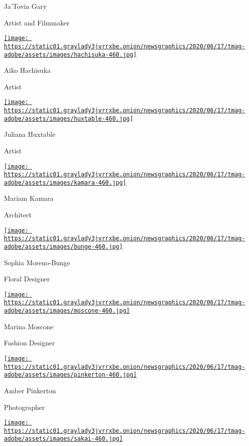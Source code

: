 Ja'Tovia Gary

Artist and Filmmaker

\href{https://www.nytimes3xbfgragh.onion/2020/08/10/t-magazine/aiko-hachisuka-art-sculpture.html}{\texttt{[image: https://static01.graylady3jvrrxbe.onion/newsgraphics/2020/06/17/tmag-adobe/assets/images/hachisuka-460.jpg]}}

Aiko Hachisuka

Artist

\href{https://www.nytimes3xbfgragh.onion/2020/08/10/t-magazine/juliana-huxtable.html}{\texttt{[image: https://static01.graylady3jvrrxbe.onion/newsgraphics/2020/06/17/tmag-adobe/assets/images/huxtable-460.jpg]}}

Juliana Huxtable

Artist

\href{https://www.nytimes3xbfgragh.onion/2020/08/10/t-magazine/mariam-kamara-architect-design.html}{\texttt{[image: https://static01.graylady3jvrrxbe.onion/newsgraphics/2020/06/17/tmag-adobe/assets/images/kamara-460.jpg]}}

Mariam Kamara

Architect

\href{https://www.nytimes3xbfgragh.onion/2020/08/10/t-magazine/sophia-moreno-bunge-floral-design.html}{\texttt{[image: https://static01.graylady3jvrrxbe.onion/newsgraphics/2020/06/17/tmag-adobe/assets/images/bunge-460.jpg]}}

Sophia Moreno-Bunge

Floral Designer

\href{https://www.nytimes3xbfgragh.onion/2020/08/10/t-magazine/marina-moscone-fashion-design.html}{\texttt{[image: https://static01.graylady3jvrrxbe.onion/newsgraphics/2020/06/17/tmag-adobe/assets/images/moscone-460.jpg]}}

Marina Moscone

Fashion Designer

\href{https://www.nytimes3xbfgragh.onion/2020/08/10/t-magazine/amber-pinkerton-photography.html}{\texttt{[image: https://static01.graylady3jvrrxbe.onion/newsgraphics/2020/06/17/tmag-adobe/assets/images/pinkerton-460.jpg]}}

Amber Pinkerton

Photographer

\href{https://www.nytimes3xbfgragh.onion/2020/08/10/t-magazine/sonoko-sakai-chef-cooking-soba.html}{\texttt{[image: https://static01.graylady3jvrrxbe.onion/newsgraphics/2020/06/17/tmag-adobe/assets/images/sakai-460.jpg]}}

